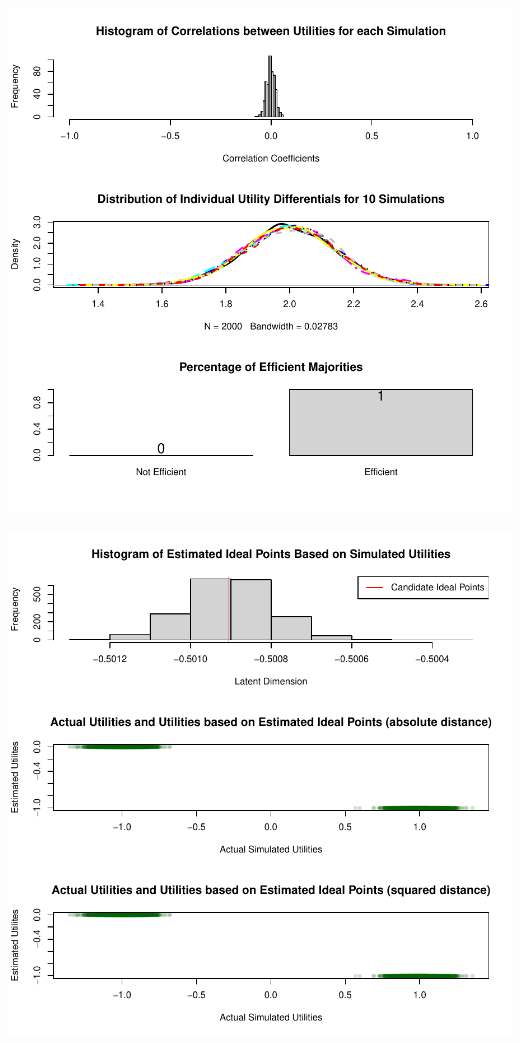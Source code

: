 \documentclass[12pt]{article}\usepackage[]{graphicx}\usepackage[]{color}
\makeatletter
\def\maxwidth{ %
  \ifdim\Gin@nat@width>\linewidth
    \linewidth
  \else
    \Gin@nat@width
  \fi
}
\newenvironment{knitrout}{}{} %
\makeatother
\begin{document}
\begin{knitrout}
\color{fgcolor}
\includegraphics[width=\maxwidth]{figure/unnamed-chunk-151} 

\includegraphics[width=\maxwidth]{figure/unnamed-chunk-152} 

\end{knitrout}
\end{document}
